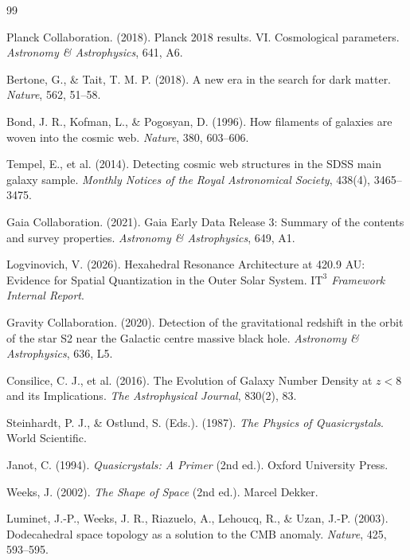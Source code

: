 \documentclass[12pt,a4paper,oneside]{article}
\newcommand{\ITthree}{\text{IT}^3}
\begin{document}
\begin{thebibliography}{99}

Planck Collaboration. (2018). Planck 2018 results. VI. Cosmological parameters. \textit{Astronomy \& Astrophysics}, 641, A6.

Bertone, G., \& Tait, T. M. P. (2018). A new era in the search for dark matter. \textit{Nature}, 562, 51--58.

Bond, J. R., Kofman, L., \& Pogosyan, D. (1996). How filaments of galaxies are woven into the cosmic web. \textit{Nature}, 380, 603--606.

Tempel, E., et al. (2014). Detecting cosmic web structures in the SDSS main galaxy sample. \textit{Monthly Notices of the Royal Astronomical Society}, 438(4), 3465--3475.

Gaia Collaboration. (2021). Gaia Early Data Release 3: Summary of the contents and survey properties. \textit{Astronomy \& Astrophysics}, 649, A1.

Logvinovich, V. (2026). Hexahedral Resonance Architecture at 420.9 AU: Evidence for Spatial Quantization in the Outer Solar System. \textit{$\ITthree$ Framework Internal Report}.

Gravity Collaboration. (2020). Detection of the gravitational redshift in the orbit of the star S2 near the Galactic centre massive black hole. \textit{Astronomy \& Astrophysics}, 636, L5.

Consilice, C. J., et al. (2016). The Evolution of Galaxy Number Density at $z < 8$ and its Implications. \textit{The Astrophysical Journal}, 830(2), 83.

Steinhardt, P. J., \& Ostlund, S. (Eds.). (1987). \textit{The Physics of Quasicrystals}. World Scientific.

Janot, C. (1994). \textit{Quasicrystals: A Primer} (2nd ed.). Oxford University Press.

Weeks, J. (2002). \textit{The Shape of Space} (2nd ed.). Marcel Dekker.

Luminet, J.-P., Weeks, J. R., Riazuelo, A., Lehoucq, R., \& Uzan, J.-P. (2003). Dodecahedral space topology as a solution to the CMB anomaly. \textit{Nature}, 425, 593--595.

\end{thebibliography}
\end{document}
